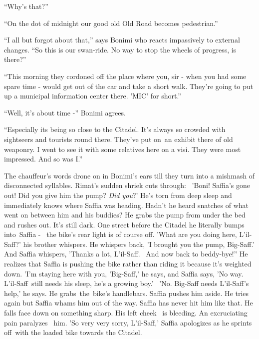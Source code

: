 \documentclass[twoside,11pt]{book}
\begin{document}
``Why's that?''

``On the dot of midnight our good old Old Road becomes pedestrian.''

``I all but forgot about that,'' says Bonimi who reacts impassively to external changes.
``So this is our swan-ride. No way to stop the wheels of progress, is there?''

``This morning they cordoned off the place where you, sir - when you had some spare time - would get out of
the car and take a short walk. They're going to put up a municipal information center there. 'MIC' for
short.''

``Well, it's about time -'' Bonimi agrees. {\ }

``Especially its being so close to the Citadel. It's always so crowded with sightseers and tourists round
there. They've put on~an exhibit there of old weaponry. I went to see it with some relatives here on a visi. They were
most impressed. And so was I.''

The chauffeur's words drone on in Bonimi's ears till they turn into a mishmash of disconnected syllables. Rimat's sudden
shriek cuts through: \ {}'Boni! Saffia's gone out! Did you give him the pump? \textit{Did you}?' He's torn from deep
sleep and immediately knows where Saffia was heading. Hadn't he heard snatches of what went on between him and his
buddies? He grabs the pump from under the bed and rushes out. It's still dark. One street before the Citadel he
literally bumps into~Saffia - \ the bike's rear light is of course off. 'What are you doing here, L'il-Saff?' his
brother whispers. He whispers back, 'I brought you the pump, Big-Saff.' And Saffia whispers, 'Thanks a lot, L'il-Saff.
~And now back to beddy-bye!'' He realizes that Saffia is pushing the bike rather than riding it because
it's weighted down. 'I'm staying here with you, 'Big-Saff,' he says, and Saffia says, 'No way. L'il-Saff~still needs
his sleep, he's a growing boy.' \ {}'No. Big-Saff needs L'il-Saff's help,' he says. He grabs~the~bike's handlebars.
Saffia pushes him aside. He tries again but Saffia whams him out of the way. Saffia has never hit him like that. He
falls face down on something sharp. His left cheek{ \ }is bleeding. An excruciating pain paralyzes
\ him. 'So very very sorry, L'il-Saff,' Saffia apologizes as he sprints off~with the loaded bike towards the Citadel.
\end{document}
